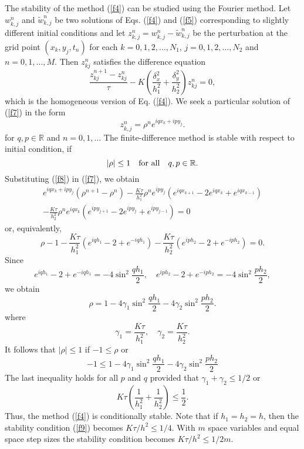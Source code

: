 \vskip 0.3cm  
The stability of the method (\ref{f4}) can be studied using the Fourier method.
Let $w^{n}_{k,j}$ and $\tilde{w}^{n}_{k,j}$ be two solutions of Eqs. (\ref{f4})
and (\ref{f5}) corresponding to slightly different initial conditions and
let $z^{n}_{k,j}=w^{n}_{k,j}-\tilde{w}^{n}_{k,j}$ be
the perturbation at the grid point $(x_{k}, y_{j}, t_{n})$ for each
$k=0,1,2, \dots, N_{1}$,
$j=0,1,2, \dots, N_{2}$ and $n=0,1, \dots,M$.
Then $z^{n}_{kj}$ satisfies the difference equation
\begin{equation}
\frac{z_{kj}^{n+1}-z_{kj}^{n}}{\tau} -K\left(\frac{\delta_{x}^2}{h_{1}^2}
+\frac{\delta_{y}^2}{h_{2}^2}\right)z_{kj}^{n}=0, \label{f7}
\end{equation}
which is the homogeneous version of Eq. (\ref{f4}).
We seek a particular solution of
(\ref{f7}) in the form
\begin{equation}
z^{n}_{k,j}=\rho^{n}e^{iqx_{k}+ipy_{j}}. \label{f8}
\end{equation}
for $q,p\in{\mathbb R}$ and $n=0,1,\dots$
The finite-difference method is stable with respect to
initial condition, if
\[
\vert\rho\vert\leq 1 \quad {\rm for \ all } \quad q,p\in{\mathbb R}.
\]
Substituting (\ref{f8}) in (\ref{f7}), we obtain
\begin{multline*}
e^{iqx_{k}+ipy_{j}}\left(\rho^{n+1}-\rho^{n}\right) -
\frac{K\tau}{h_{1}^2}\rho^{n}e^{ipy_{j}}
\left(e^{iqx_{k+1}}-2e^{iqx_{k}}+e^{iqx_{k-1}}\right)\\
-\frac{K\tau}{h_{2}^2}\rho^{n}e^{iqx_{k}}
\left(e^{ipy_{j+1}}-2e^{ipy_{j}}+e^{ipy_{j-1}}\right)=0
\end{multline*}
or, equivalently,
\[
\rho-1-\frac{K\tau}{h_{1}^2}
\left(e^{iqh_{1}}-2+e^{-iqh_{1}}\right)-
\frac{K\tau}{h_{2}^2}\left(e^{iph_{2}}-2+e^{-iph_{2}}\right)=0.
\]
Since
\[
e^{iqh_{1}}-2+e^{-iqh_{1}}=-4\sin^{2} \frac{qh_{1}}{2}, \quad
e^{iph_{2}}-2+e^{-iph_{2}}=-4\sin^{2} \frac{ph_{2}}{2},
\]
we obtain
\[
\rho=1-4\gamma_{1}\sin^{2} \frac{qh_{1}}{2}
-4\gamma_{2}\sin^{2} \frac{ph_{2}}{2}.
\]
where
\[
\gamma_{1}=\frac{K\tau}{h_{1}^2}, \quad
\gamma_{2}=\frac{K\tau}{h_{2}^2}.
\]
It follows that $\vert\rho\vert\leq 1$ if $-1\leq\rho$ or
\[
-1\leq 1-4\gamma_{1}\sin^{2} \frac{qh_{1}}{2}
-4\gamma_{2}\sin^{2} \frac{ph_{2}}{2}
\]
The last inequality holds for all $p$ and $q$ provided that $\gamma_{1}+\gamma_{2}\leq 1/2$
or
\begin{equation}
K\tau
\left(\frac{1}{h_{1}^2}+\frac{1}{h_{2}^2}\right)\leq\frac{1}{2}. \label{f9}
\end{equation}
Thus, the method (\ref{f4}) is conditionally stable. Note that if
$h_{1}=h_{2}=h$, then the stability condition (\ref{f9}) becomes
$K\tau/h^2\leq 1/4$. With $m$ space variables and equal space step
sizes the stability condition becomes $K\tau/h^2\leq 1/2m$.



